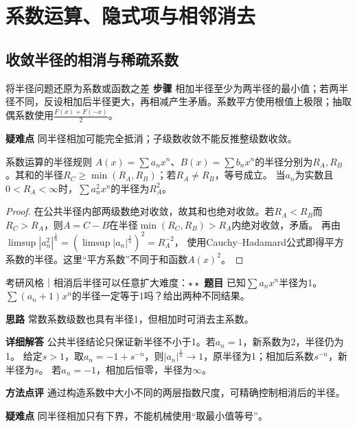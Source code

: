 \section{系数运算、隐式项与相邻消去}\label{cse:section}
\subsection{收敛半径的相消与稀疏系数}\label{cse:radius}
\begin{method}{将半径问题还原为系数或函数之差}
\textbf{步骤} 相加半径至少为两半径的最小值；若两半径不同，反设相加后半径更大，再相减产生矛盾。系数平方使用根值上极限；抽取偶系数使用$\frac{F(x)+F(-x)}{2}$。
\par\textbf{疑难点} 同半径相加可能完全抵消；子级数收敛不能反推整级数收敛。
\end{method}
\begin{theorem}{系数运算的半径规则}\label{cse:thm:radius}
$A(x)=\sum a_nx^n$、$B(x)=\sum b_nx^n$的半径分别为$R_A,R_B$。其和的半径$R_C\ge\min(R_A,R_B)$；若$R_A\ne R_B$，等号成立。
当$a_n$为实数且$0<R_A<\infty$时，$\sum a_n^2x^n$的半径为$R_A^2$。
\end{theorem}
\begin{proof}
在公共半径内部两级数绝对收敛，故其和也绝对收敛。若$R_A<R_B$而$R_C>R_A$，则$A=C-B$在半径$\min(R_C,R_B)>R_A$内绝对收敛，矛盾。
再由
$\limsup|a_n^2|^{\frac{1}{n}}=(\limsup|a_n|^{\frac{1}{n}})^2=R_A^{-2}$，
使用Cauchy--Hadamard公式即得平方系数的半径。这里“平方系数”不同于和函数$A(x)^2$。
\end{proof}
\begin{example}{考研风格｜相消后半径可以任意扩大}{难度：$\star\star$}\label{cse:ex:cancellation}
\textbf{题目} 已知$\sum a_nx^n$半径为1。$\sum(a_n+1)x^n$的半径一定等于1吗？给出两种不同结果。
\par\textbf{思路} 常数系数级数也具有半径1，但相加时可消去主系数。
\par\textbf{详细解答} 公共半径结论只保证新半径不小于1。若$a_n=1$，新系数为2，半径仍为1。
给定$s>1$，取$a_n=-1+s^{-n}$，则$|a_n|^{\frac{1}{n}}\to1$，原半径为1；相加后系数$s^{-n}$，新半径为$s$。
若$a_n=-1$，相加后恒零，半径为$\infty$。
\par\textbf{方法点评} 通过构造系数中大小不同的两层指数尺度，可精确控制相消后的半径。
\par\textbf{疑难点} 同半径相加只有下界，不能机械使用“取最小值等号”。
\end{example}

